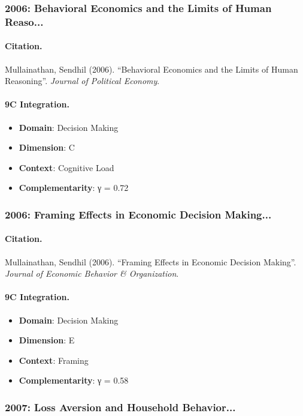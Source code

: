 \subsubsection{2006: Behavioral Economics and the Limits of Human Reaso...}

\paragraph{Citation.}
Mullainathan, Sendhil (2006). ``Behavioral Economics and the Limits of Human Reasoning''. \textit{Journal of Political Economy}.

\paragraph{9C Integration.}
\begin{itemize}[nosep]
  \item \textbf{Domain}: Decision Making
  \item \textbf{Dimension}: C
  \item \textbf{Context}: Cognitive Load
  \item \textbf{Complementarity}: γ = 0.72
\end{itemize}


\subsubsection{2006: Framing Effects in Economic Decision Making...}

\paragraph{Citation.}
Mullainathan, Sendhil (2006). ``Framing Effects in Economic Decision Making''. \textit{Journal of Economic Behavior & Organization}.

\paragraph{9C Integration.}
\begin{itemize}[nosep]
  \item \textbf{Domain}: Decision Making
  \item \textbf{Dimension}: E
  \item \textbf{Context}: Framing
  \item \textbf{Complementarity}: γ = 0.58
\end{itemize}


\subsubsection{2007: Loss Aversion and Household Behavior...}

